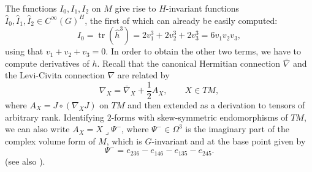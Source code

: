 \documentclass[12pt]{scrartcl}
\theoremstyle{plain}
\theoremstyle{definition}
\newcommand{\tr}{\operatorname{tr}}%
\begin{document}
The functions $I_0,I_1,I_2$ on $M$ give rise to $H$-invariant functions $\hat I_0,\hat I_1,\hat I_2\in C^\infty(G)^H$, the first of which can already be easily computed:
\[\hat I_0=\tr(\hat h^3)=2v_1^3+2v_2^3+2v_3^3=6v_1v_2v_3,\]
using that $v_1+v_2+v_3=0$. In order to obtain the other two terms, we have to compute derivatives of $h$. Recall that the canonical Hermitian connection $\bar\nabla$ and the Levi-Civita connection $\nabla$ are related by
\[\nabla_X=\bar\nabla_X+\frac{1}{2}A_X,\qquad X\in TM,\]
where $A_X=J\circ(\nabla_XJ)$ on $TM$ and then extended as a derivation to tensors of arbitrary rank. Identifying $2$-forms with skew-symmetric endomorphisms of $TM$, we can also write $A_X=X\lrcorner\Psi^-$, where $\Psi^-\in\Omega^3$ is the imaginary part of the complex volume form of $M$, which is $G$-invariant and at the base point given by
\[\Psi^-=e_{236}-e_{146}-e_{135}-e_{245}.\]
(see also \cite[Sec.~6]{hermitianlaplace}).
\end{document}
